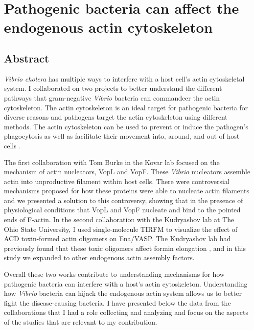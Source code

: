 \chapter{Pathogenic bacteria can affect the endogenous actin cytoskeleton}\label{ch:vibrio}

\section[Abstract]{Abstract\footnotemark}
\textit{Vibrio cholera} has multiple ways to interfere with a host cell’s actin cytoskeletal system. I collaborated on two projects to better understand the different pathways that gram-negative \textit{Vibrio} bacteria can commandeer the actin cytoskeleton. The actin cytoskeleton is an ideal target for pathogenic bacteria for diverse reasons and pathogens target the actin cytoskeleton using different methods. The actin cytoskeleton can be used to prevent or induce the pathogen's phagocytosis as well as facilitate their movement into, around, and out of host cells \citep{liverman_arp2/3-independent_2007}. 

The first collaboration with Tom Burke in the Kovar lab focused on the mechanism of actin nucleators, VopL and VopF. These \textit{Vibrio} nucleators assemble actin into unproductive filament within host cells. There were controversial mechanisms proposed for how these proteins were able to nucleate actin filaments and we presented a solution to this controversy, showing that in the presence of physiological conditions that VopL and VopF nucleate and bind to the pointed ends of F-actin. In the second collaboration with the Kudryashov lab at The Ohio State University, I used single-molecule TIRFM to visualize the effect of ACD toxin-formed actin oligomers on Ena/VASP. The Kudryashov lab had previously found that these toxic oligomers affect formin elongation \citep{heisler_acd_2015}, and in this study we expanded to other endogenous actin assembly factors. 

Overall these two works contribute to understanding mechanisms for how pathogenic bacteria can interfere with a host's actin cytoskeleton. Understanding how \textit{Vibrio} bacteria can hijack the endogenous actin system allows us to better fight the disease-causing bacteria. I have presented below the data from the collaborations that I had a role collecting and analyzing and focus on the aspects of the studies that are relevant to my contribution. 


